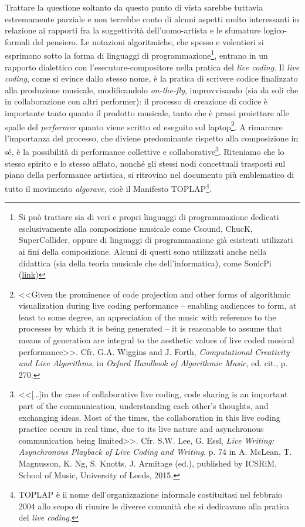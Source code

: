 \documentclass[a4paper,12pt]{scrartcl}
\newcommand{\omissis}{[\dots\unkern]}
\begin{document}
	Trattare la questione soltanto da questo punto di vista sarebbe tuttavia estremamente parziale e non terrebbe conto di alcuni aspetti molto interessanti in relazione ai rapporti fra la soggettività dell'uomo-artista e le sfumature logico-formali del pensiero. Le notazioni algoritmiche, che spesso e volentieri si esprimono sotto la forma di linguaggi di programmazione\footnote{Si può trattare sia di veri e propri linguaggi di programmazione dedicati esclusivamente alla composizione musicale come Csound, ChucK, SuperCollider, oppure di linguaggi di programmazione già esistenti utilizzati ai fini della composizione. Alcuni di questi sono utilizzati anche nella didattica (sia della teoria musicale che dell'informatica), come  SonicPi (\href{https://sonic-pi.net}{link})},
	entrano in un rapporto dialettico con l'esecutore-compositore nella pratica del \emph{live coding}. Il \emph{live coding}, come si evince dallo stesso nome, è la pratica di scrivere codice finalizzato alla produzione musicale, modificandolo \emph{on-the-fly}, improvvisando (sia da soli che in collaborazione con altri performer): il processo di creazione di codice è importante tanto quanto il prodotto musicale, tanto che è prassi proiettare alle spalle del \textit{performer} quanto viene scritto ed eseguito sul laptop\footnote{<<Given the prominence of code projection and other forms of algorithmic visualization during live coding performance -- enabling audiences to form, at least to some degree, an appreciation of the music with reference to the processes by which it is being generated -- it is reasonable to assume that means of generation are integral to the aesthetic values of live coded mosical performance>>. Cfr. G.A. Wiggins and J. Forth, \textit{Computational Creativity and Live Algorithms}, in \textit{Oxford Handbook of Algorithmic Music}, ed. cit., p. 270.}. 
	A rimarcare l'importanza del processo, che diviene predominante rispetto alla composizione in sé, è la possibilità di performance collettive e collaborative\footnote{<<\omissis in the case of collaborative live coding, code sharing is an important part of the communication, understanding each other's thoughts, and exchanging ideas. Most of the times, the collaboration in this live coding practice occurs in real time, due to its live nature and asynchronous communication being limited>>. Cfr. S.W. Lee, G. Essl, \textit{Live Writing: Asynchronous Playback of Live Coding and Writing}, p. 74 in A. McLean, T. Magnusson, K. Ng, S. Knotts, J. Armitage (ed.), published by ICSRiM, School of Music, University of Leeds, 2015.}. 
	Riteniamo che lo stesso spirito e lo stesso afflato, nonché gli stessi nodi concettuali trasposti sul piano della performance artistica, si ritrovino nel documento più emblematico di tutto il movimento \emph{algorave}, cioè il Manifesto TOPLAP\footnote{TOPLAP è il nome dell'organizzazione informale costituitasi nel febbraio 2004 allo scopo di riunire le diverse comunità che si dedicavano alla pratica del \emph{live coding}.}. 
\end{document}
